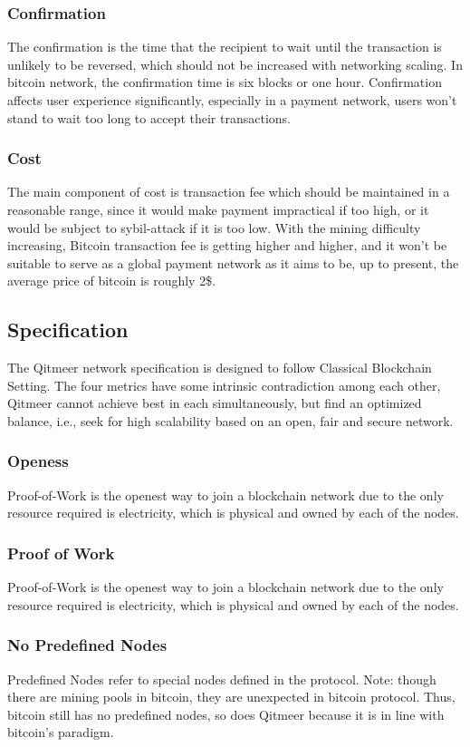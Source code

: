\documentclass[a4paper,11pt]{article}
\begin{document}
\subsubsection*{Confirmation}
The confirmation is the time that the recipient to wait until the transaction is unlikely to be reversed, which should not be increased with networking scaling. In bitcoin network, the confirmation time is six blocks or one hour.  Confirmation affects user experience significantly, especially in a payment network, users won’t stand to wait too long to accept their transactions.
\subsubsection*{Cost}
The main component of cost is transaction fee which should be maintained in a  reasonable range, since it would make payment impractical if too high, or it would be subject to sybil-attack if it is too low. With the mining difficulty increasing, Bitcoin transaction fee is getting higher and higher, and it won’t be suitable to serve as a global payment network as it aims to be, up to present, the average price of bitcoin is roughly 2\$. 

\subsection{Specification}
The Qitmeer network specification is designed to follow Classical Blockchain Setting. The four metrics have some intrinsic contradiction among each other, Qitmeer cannot achieve best in each simultaneously, but find an optimized balance, i.e., seek for high scalability based on an open, fair and secure network.
\subsubsection{Openess}
Proof-of-Work is the openest way to join a blockchain network due to the only resource required is electricity, which is physical and owned by each of the nodes.  
\subsubsection*{Proof of Work}
Proof-of-Work is the openest way to join a blockchain network due to the only resource required is electricity, which is physical and owned by each of the nodes.  
\subsubsection*{No Predefined Nodes}
Predefined Nodes refer to special nodes defined in the protocol. Note: though there are mining pools in bitcoin,  they are unexpected in bitcoin protocol. Thus,  bitcoin still has no predefined nodes, so does Qitmeer because it is in line with bitcoin’s paradigm.
\end{document}
